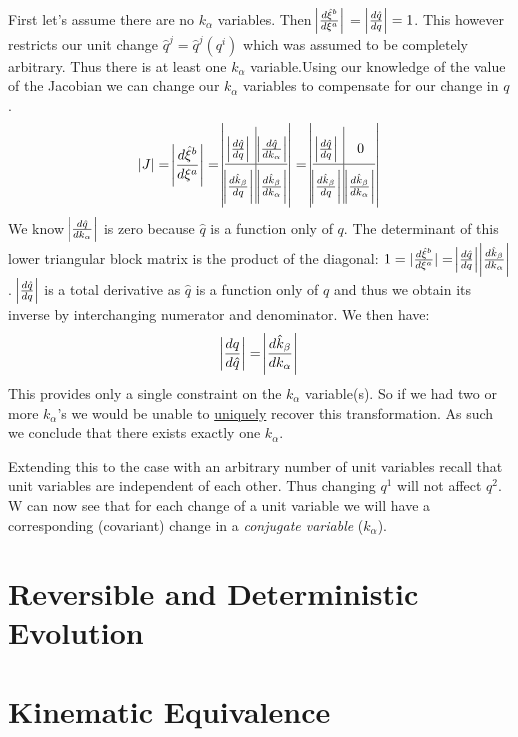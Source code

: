 \documentclass{article}
\begin{document}
	First let's assume there are no $k_\alpha$ variables. Then $\abs{\frac{d\hat{\xi}^b}{d\xi^a}}$ = $\abs{\frac{d\hat{q}}{dq}} = 1$. This however restricts our unit change $\hat{q}^j = \hat{q}^j(q^i)$ which was assumed to be completely arbitrary. Thus there is at least one $k_\alpha$ variable.Using our knowledge of the value of the Jacobian we can change our $k_\alpha$ variables to compensate for our change in $q$.
	\begin{equation}
	\label{}
	\abs{J} = \abs{\frac{d\hat{\xi}^b}{d\xi^a}} = \abs{ \arraycolsep=1.7pt\def\arraystretch{2.2}
	\begin{array}{@{}c|c@{}} \abs{\frac{d\hat{q}}{dq}} & \abs{\frac{d\hat{q}}{dk_\alpha}} \\
\hline \abs{\frac{d\hat{k}_\beta}{dq}} & \abs{\frac{d\hat{k}_\beta}{dk_\alpha}}
\end{array}	} = \abs{ \arraycolsep=1.7pt\def\arraystretch{2.2}
	\begin{array}{@{}c|c@{}} \abs{\frac{d\hat{q}}{dq}} & 0 \\
\hline \abs{\frac{d\hat{k}_\beta}{dq}} & \abs{\frac{d\hat{k}_\beta}{dk_\alpha}}
\end{array}	}
	\end{equation}
We know $\abs{\frac{d\hat{q}}{dk_\alpha}}$ is zero because $\hat{q}$ is a function only of $q$. The determinant of this lower triangular block matrix is the product of the diagonal: $1 = |\frac{d\hat{\xi}^b}{d\xi^a}| = \abs{\frac{d\hat{q}}{dq}}\abs{\frac{d\hat{k}_\beta}{dk_\alpha}}$. $\abs{\frac{d\hat{q}}{dq}}$ is a total derivative as $\hat{q}$ is a function only of $q$ and thus we obtain its inverse by interchanging numerator and denominator. We then have:
	\begin{equation}
	\label{}
	 \abs{\frac{dq}{d\hat{q}}} = \abs{\frac{d\hat{k}_\beta}{dk_\alpha}}
	\end{equation}
This provides only a single constraint on the $k_\alpha$ variable(s). So if we had two or more $k_\alpha$'s we would be unable to \underline{uniquely} recover this transformation. As such we conclude that there exists exactly one $k_\alpha$. 

Extending this to the case with an arbitrary number of unit variables recall that unit variables are independent of each other. Thus changing $q^1$ will not affect $q^2$. W can now see that for each change of a unit variable we will have a corresponding (covariant) change in a \textit{conjugate variable} ($k_\alpha$).
	
\section{Reversible and Deterministic Evolution}

\section{Kinematic Equivalence}
\end{document}
